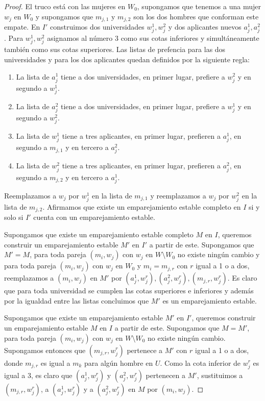 \begin{proof}
El truco está con las mujeres en $W_0$, supongamos que tenemos a una mujer $w_j$ en $W_0$ y supongamos que $m_{j,1} $ y $m_{j,2}$ son los dos hombres que conforman este empate. En $I'$ construimos dos universidades $w_j^{1}, w_{j}^2$ y dos aplicantes nuevos $a_j^1, a_j^2$. Para $w_j^{1}, w_{j}^2$ asignamos al número 3 como sus cotas inferiores y simultáneamente también como sus cotas superiores. Las listas de prefencia para las dos universidades y para los dos aplicantes quedan definidos por la siguiente regla:
\begin{enumerate}
\item La lista de $a_j^1$ tiene a dos universidades, en primer lugar, prefiere a $w_j^2$ y en segundo a $w_j^1$.
\item La lista de $a_j^2$ tiene a dos universidades, en primer lugar, prefiere a $w_j^1$ y en segundo a $w_j^2$.
\item La lista de $w_j^1$ tiene a tres aplicantes, en primer lugar, prefieren a $a_j^1$, en segundo a $m_{j,1}$ y en tercero a $a_j^2$.
\item La lista de $w_j^2$ tiene a tres aplicantes, en primer lugar, prefieren a $a_j^2$, en segundo a $m_{j,2}$ y en tercero a $a_j^1$.
\end{enumerate}

Reemplazamos a $w_j$ por $w_j^1$ en la lista de $m_{j,1}$ y reemplazamos a $w_j$ por $w_j^2$ en la lista de $m_{j,2}$. Afirmamos que existe un emparejamiento estable completo en $I$ si y solo si $I'$ cuenta con un emparejamiento estable. 

Supongamos que existe un emparejamiento estable completo $M$ en $I$, queremos construir un emparejamiento estable $M'$ en $I'$ a partir de este. Supongamos que $M'=M$, para toda pareja $(m_i,w_j)$ con $w_j$ en $W\setminus W_0$ no existe ningún cambio y para toda pareja $(m_i,w_j)$ con $w_j$ en $W_0$ y $m_i=m_{j,r}$ con $r$ igual a 1 o a dos, reemplazamos a $(m_i,w_j)$ en $M'$ por $(a_j^1,w_j^r), (a_j^2,w_j^r),(m_{j,r}, w_j^r)$. Es claro que para toda universidad se cumplen las cotas superiores e inferiores y además por la igualdad entre las listas concluimos que $M'$ es un emparejamiento estable. 

Supongamos que existe un emparejamiento estable $M'$ en $I'$, queremos construir un emparejamiento estable $M$ en $I$ a partir de este. Supongamos que $M=M'$, para toda pareja $(m_i,w_j)$ con $w_j$ en $W\setminus W_0$ no existe ningún cambio. Supongamos entonces que $(m_{j,r}, w_{j}^{r})$ pertenece a $M'$ con $r$ igual a 1 o a dos, donde $m_{j,r}$ es igual a $m_k$ para algún hombre en $U$. Como la cota inferior de $w_{j}^{r}$ es igual a 3, es claro que $(a_j^1,w_{j}^{r})$ y $(a_j^2,w_{j}^{r})$ pertenecen a $M'$, sustituimos a $(m_{j,r}, w_{j}^{r})$, a $(a_j^1,w_{j}^{r})$ y a $(a_j^2,w_{j}^{r})$ en $M$ por $(m_i,w_j)$.


\end{proof}
